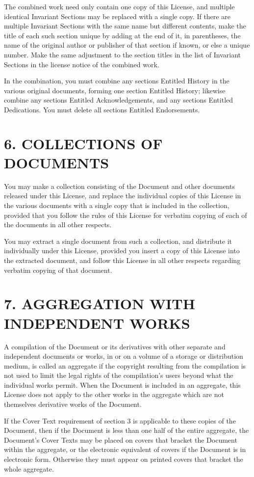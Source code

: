\documentclass[captions=tableheading]{scrbook}
\begin{document}
The combined work need only contain one copy of this License, and multiple identical Invariant Sections may be replaced with a single copy. If there are multiple Invariant Sections with the same name but different contents, make the title of each such section unique by adding at the end of it, in parentheses, the name of the original author or publisher of that section if known, or else a unique number. Make the same adjustment to the section titles in the list of Invariant Sections in the license notice of the combined work.

In the combination, you must combine any sections Entitled History in the various original documents, forming one section Entitled History;
likewise combine any sections Entitled Acknowledgements, and any sections Entitled Dedications. You must delete all sections Entitled Endorsements.
\section{6. COLLECTIONS OF DOCUMENTS}
\label{sec-18-7}


You may make a collection consisting of the Document and other documents released under this License, and replace the individual copies of this License in the various documents with a single copy that is included in the collection, provided that you follow the rules of this License for verbatim copying of each of the documents in all other respects. 

You may extract a single document from such a collection, and distribute it individually under this License, provided you insert a copy of this License into the extracted document, and follow this License in all other respects regarding verbatim copying of that document.
\section{7. AGGREGATION WITH INDEPENDENT WORKS}
\label{sec-18-8}


A compilation of the Document or its derivatives with other separate and independent documents or works, in or on a volume of a storage or distribution medium, is called an aggregate if the copyright resulting from the compilation is not used to limit the legal rights of the compilation's users beyond what the individual works permit. When the Document is included in an aggregate, this License does not apply to the other works in the aggregate which are not themselves derivative works of the Document.

If the Cover Text requirement of section 3 is applicable to these copies of the Document, then if the Document is less than one half of the entire aggregate, the Document's Cover Texts may be placed on covers that bracket the Document within the aggregate, or the electronic equivalent of covers if the Document is in electronic form. Otherwise they must appear on printed covers that bracket the whole aggregate.
\end{document}
